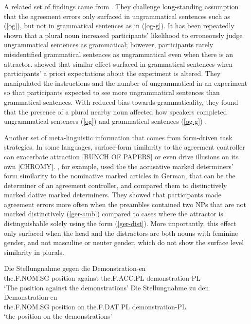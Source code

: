 \documentclass[
  authoryear,
  preprint]{elsarticle}
\begin{document}
A related set of findings came from \citet{HammerlyEtAl2019}. They
challenge long-standing assumption that the agreement errors only
surfaced in ungrammatical sentences such as (\ref{og}), but not in
grammatical sentences as in (\ref{og-g}). It has been repeatedly shown
that a plural noun increased participants' likelihood to erroneously
judge ungrammatical sentences as grammatical; however, participants
rarely misidentified grammatical sentences as ungrammatical even when
there is an attractor. \citet{HammerlyEtAl2019} showed that similar
effect surfaced in grammatical sentences when participants' a priori
expectations about the experiment is altered. They manipulated the
instructions and the number of ungrammatical in an experiment so that
participants expected to see more ungrammatical sentences than
grammatical sentences. With reduced bias towards grammaticality, they
found that the presence of a plural nearby noun affected how speakers
completed ungrammatical sentences (\ref{og}) and grammatical sentences
(\ref{og-g}) \citep[see][ for acceptability]{Turk2022}.

\begin{exe}
\end{exe}

Another set of meta-linguistic information that comes from form-driven
task strategies. In some languages, surface-form similarity to the
agreement controller can exacerbate attraction {[}BUNCH OF PAPERS{]} or
even drive illusions on its own {[}CHROMY{]}.
\citet{HartsuikerEtAl2003}, for example, used the the accusative marked
determiners' form similarity to the nominative marked articles in
German, that can be the determiner of an agreement controller, and
compared them to distinctively marked dative marked determiners. They
showed that participants made agreement errors more often when the
preambles contained two NPs that are not marked distinctively
(\ref{ger-amb}) compared to cases where the attractor is distinguishable
solely using the form (\ref{ger-dist}). More importantly, this effect
only surfaced when the head and the distractors are both nouns with
feminine gender, and not masculine or neuter gender, which do not show
the surface level similarity in plurals.

\begin{exe}
\ex \label{ger}
\begin{xlist}
\ex \label{ger-amb}
\gll Die Stellungnahme gegen die Demonstration-en\\
the.F.NOM.SG position against the.F.ACC.PL demonstration-PL\\
\glt `The position against the demonstrations' 
\ex \label{ger-dist}
\gll Die Stellungnahme zu den Demonstration-en\\
the.F.NOM.SG position on the.F.DAT.PL demonstration-PL\\
\glt `the position on the demonstrations' 
\end{xlist}
\end{exe}
\end{document}
